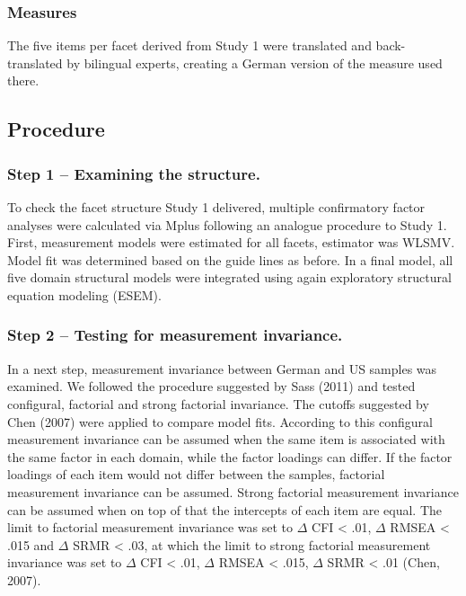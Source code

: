 \documentclass[,man,floatsintext]{apa6}
\theoremstyle{definition}
\theoremstyle{definition}
\theoremstyle{definition}
\theoremstyle{remark}
\begin{document}
\hypertarget{measures}{%
\subsubsection{Measures}\label{measures}}

The five items per facet derived from Study 1 were translated and
back-translated by bilingual experts, creating a German version of the
measure used there.

\hypertarget{procedure-1}{%
\subsection{Procedure}\label{procedure-1}}

\hypertarget{step-1-examining-the-structure.}{%
\subsubsection{Step 1 -- Examining the
structure.}\label{step-1-examining-the-structure.}}

To check the facet structure Study 1 delivered, multiple confirmatory
factor analyses were calculated via Mplus following an analogue
procedure to Study 1. First, measurement models were estimated for all
facets, estimator was WLSMV. Model fit was determined based on the guide
lines as before. In a final model, all five domain structural models
were integrated using again exploratory structural equation modeling
(ESEM).

\hypertarget{step-2-testing-for-measurement-invariance.}{%
\subsubsection{Step 2 -- Testing for measurement
invariance.}\label{step-2-testing-for-measurement-invariance.}}

In a next step, measurement invariance between German and US samples was
examined. We followed the procedure suggested by Sass (2011) and tested
configural, factorial and strong factorial invariance. The cutoffs
suggested by Chen (2007) were applied to compare model fits. According
to this configural measurement invariance can be assumed when the same
item is associated with the same factor in each domain, while the factor
loadings can differ. If the factor loadings of each item would not
differ between the samples, factorial measurement invariance can be
assumed. Strong factorial measurement invariance can be assumed when on
top of that the intercepts of each item are equal. The limit to
factorial measurement invariance was set to \(\Delta\) CFI \textless{}
.01, \(\Delta\) RMSEA \textless{} .015 and \(\Delta\) SRMR \textless{}
.03, at which the limit to strong factorial measurement invariance was
set to \(\Delta\) CFI \textless{} .01, \(\Delta\) RMSEA \textless{}
.015, \(\Delta\) SRMR \textless{} .01 (Chen, 2007).
\end{document}
